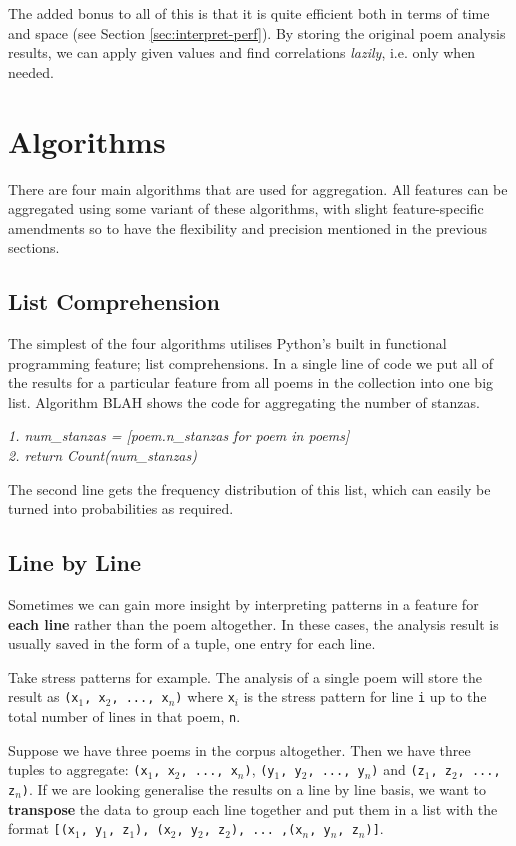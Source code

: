 The added bonus to all of this is that it is quite efficient both in terms of time and space (see Section \ref{sec:interpret-perf}). By storing the original poem analysis results, we can apply given values and find correlations \textit{lazily}, i.e. only when needed.


\section{Algorithms}

There are four main algorithms that are used for aggregation. All features can be aggregated using some variant of these algorithms, with slight feature-specific amendments so to have the flexibility and precision mentioned in the previous sections.

\subsection{List Comprehension}
\label{sec:listcomp}

The simplest of the four algorithms utilises Python's built in functional programming feature; list comprehensions. In a single line of code we put all of the results for a particular feature from all poems in the collection into one big list. Algorithm BLAH shows the code for aggregating the number of stanzas.

\textit{
1. num\_stanzas = [poem.n\_stanzas for poem in poems]\\
2. return Count(num\_stanzas)
}

The second line gets the frequency distribution of this list, which can easily be turned into probabilities as required.


\subsection{Line by Line}

Sometimes we can gain more insight by interpreting patterns in a feature for \textbf{each line} rather than the poem altogether. In these cases, the analysis result is usually saved in the form of a tuple, one entry for each line.

Take stress patterns for example. The analysis of a single poem will store the result as \texttt{(x$_1$, x$_2$, ..., x$_n$)} where \texttt{x$_i$} is the stress pattern for line \texttt{i} up to the total number of lines in that poem, \texttt{n}.

Suppose we have three poems in the corpus altogether. Then we have three tuples to aggregate: \texttt{(x$_1$, x$_2$, ..., x$_n$)}, \texttt{(y$_1$, y$_2$, ..., y$_n$)} and \texttt{(z$_1$, z$_2$, ..., z$_n$)}. If we are looking generalise the results on a line by line basis, we want to \textbf{transpose} the data to group each line together and put them in a list with the format \texttt{[(x$_1$, y$_1$, z$_1$), (x$_2$, y$_2$, z$_2$), ... ,(x$_n$, y$_n$, z$_n$)]}.

